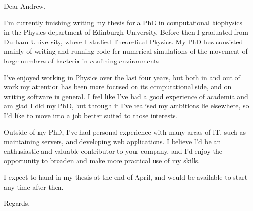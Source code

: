 \documentclass[10pt]{letter}
\begin{document}
    \begin{letter}{}

        \opening{Dear Andrew,}

        I'm currently finishing writing my thesis for a PhD in computational biophysics in the Physics department of Edinburgh University. Before then I graduated from Durham University, where I studied Theoretical Physics. My PhD has consisted mainly of writing and running code for numerical simulations of the movement of large numbers of bacteria in confining environments.

        I've enjoyed working in Physics over the last four years, but both in and out of work my attention has been more focused on its computational side, and on writing software in general. I feel like I've had a good experience of academia and am glad I did my PhD, but through it I've realised my ambitions lie elsewhere, so I'd like to move into a job better suited to those interests.

        Outside of my PhD, I've had personal experience with many areas of IT, such as maintaining servers, and developing web applications. I believe I'd be an enthusiastic and valuable contributor to your company, and I'd enjoy the opportunity to broaden and make more practical use of my skills.

        I expect to hand in my thesis at the end of April, and would be available to start any time after then.

        \closing{Regards,}

    \end{letter}        
\end{document}
